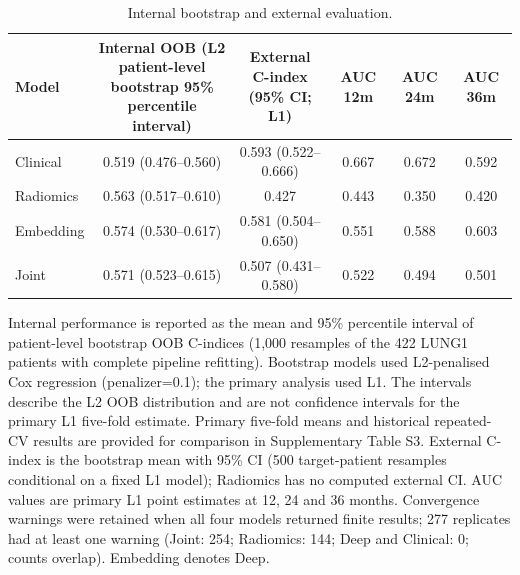 \documentclass[a4paper,fleqn]{cas-sc}
\begin{document}
\begin{table}[htbp]
\end{table}

\begin{table}[htbp]
\centering
\small
\setlength{\tabcolsep}{4pt}
\caption{Internal bootstrap and external evaluation.}
\label{tbl:2}
\begin{tabular}{@{}lccccc@{}}
\toprule
Model & \shortstack{Internal OOB (L2 patient-level\\bootstrap 95\% percentile interval)} & \shortstack{External C-index\\(95\% CI; L1)} & AUC 12m & AUC 24m & AUC 36m \\
\midrule
Clinical & 0.519 (0.476--0.560) & 0.593 (0.522--0.666) & 0.667 & 0.672 & 0.592 \\
Radiomics & 0.563 (0.517--0.610) & 0.427 & 0.443 & 0.350 & 0.420 \\
Embedding & 0.574 (0.530--0.617) & 0.581 (0.504--0.650) & 0.551 & 0.588 & 0.603 \\
Joint & 0.571 (0.523--0.615) & 0.507 (0.431--0.580) & 0.522 & 0.494 & 0.501 \\
\bottomrule
\end{tabular}
\par\medskip\noindent\footnotesize Internal performance is reported as the mean and 95\% percentile interval of patient-level bootstrap OOB C-indices (1,000 resamples of the 422 LUNG1 patients with complete pipeline refitting). Bootstrap models used L2-penalised Cox regression (penalizer=0.1); the primary analysis used L1. The intervals describe the L2 OOB distribution and are not confidence intervals for the primary L1 five-fold estimate. Primary five-fold means and historical repeated-CV results are provided for comparison in Supplementary Table S3. External C-index is the bootstrap mean with 95\% CI (500 target-patient resamples conditional on a fixed L1 model); Radiomics has no computed external CI. AUC values are primary L1 point estimates at 12, 24 and 36 months. Convergence warnings were retained when all four models returned finite results; 277 replicates had at least one warning (Joint: 254; Radiomics: 144; Deep and Clinical: 0; counts overlap). Embedding denotes Deep.
\end{table}
\end{document}
